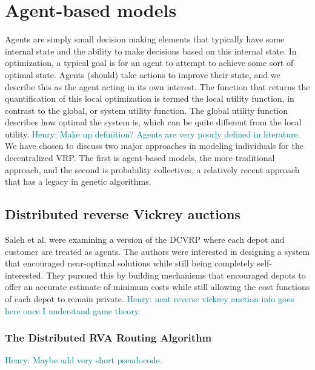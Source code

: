 \documentclass{sig-alternate}
\newcommand{\allcomments}[1]{{#1}}
\newcommand{\hfcomment}[1]{\textcolor{Teal}{\allcomments{Henry: {#1}}}}
\begin{document}
{\section{Agent-based models}
Agents are simply small decision making elements that typically have some internal state and the ability to make decisions based on this internal state. In optimization, a typical goal is for an agent to attempt to achieve some sort of optimal state. Agents (should) take actions to improve their state, and we describe this as the agent acting in its own interest. The function that returns the quantification of this local optimization is termed the local utility function, in contrast to the global, or system utility function. The global utility function describes how optimal the system is, which can be quite different from the local utility. 
\hfcomment{Make up definition? Agents are very poorly defined in literature.}
We have chosen to discuss two major approaches in modeling individuals for the decentralized VRP. The first is agent-based models, the more traditional approach, and the second is probability collectives, a relatively recent approach that has a legacy in genetic algorithms.

\subsection{Distributed reverse Vickrey auctions}

Saleh et al.\cite{Saleh:2012} were examining a version of the DCVRP where each depot and customer are treated as agents. The authors were interested in designing a system that encouraged near-optimal solutions while still being completely self-interested. They pursued this by building mechanisms that encouraged depots to offer an accurate estimate of minimum costs while still allowing the cost functions of each depot to remain private. \hfcomment{neat reverse vickrey auction info goes here once I understand game theory.}

\subsubsection{The Distributed RVA Routing Algorithm}

\hfcomment{Maybe add very short pseudocode.}

}
\end{document}
